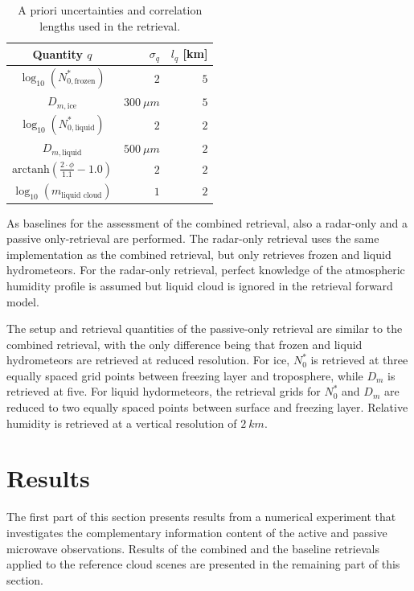 \documentclass[journal abbreviation, manuscript]{copernicus}
\begin{document}
\begin{table}[h!]
\caption{A priori uncertainties and correlation
 lengths used in the retrieval.}
 \centering
\label{tab:a_priori}
    \begin{tabular}{c|r|r}
     Quantity $q$ & $\sigma_q$ & $l_q$ [km]\\
    \hline
    $\log_{10}(N_{0, \text{frozen}}^*)$    & $2$                       & $5$ \\
    $D_{m, \text{ice}}$               & $300\ \unit{\mu m}$          & $5$ \\
    $\log_{10}(N_{0, \text{liquid}}^*)$    & $2                      $ & $2$ \\
    $D_{m, \text{liquid}}$            & $500\ \unit{\mu m}$           & $2$ \\
    $\text{arctanh}(\frac{2 \cdot \phi}{1.1} - 1.0)$ & $2$       & $2$ \\
    $\log_{10}(m_\text{liquid cloud}) $ & $1$                       & $2$ \\
    \end{tabular}
\end{table}

As baselines for the assessment of the combined retrieval, also a radar-only and
a passive only-retrieval are performed. The radar-only retrieval uses the same
implementation as the combined retrieval, but only retrieves frozen and liquid
hydrometeors. For the radar-only retrieval, perfect knowledge of the atmospheric
humidity profile is assumed but liquid cloud is ignored in the retrieval forward
model.

The setup and retrieval quantities of the passive-only retrieval are similar to
the combined retrieval, with the only difference being that frozen and liquid
hydrometeors are retrieved at reduced resolution. For ice, $N_0^*$ is retrieved
at three equally spaced grid points between freezing layer and troposphere, while
$D_m$ is retrieved at five. For liquid hydormeteors, the retrieval grids for
$N_0^*$ and $D_m$ are reduced to two equally spaced points between surface and
freezing layer. Relative humidity is retrieved at a vertical resolution of
$2\ \unit{km}$.

\section{Results}
\label{sec:results}

The first part of this section presents results from a numerical experiment 
that investigates the complementary information content of the active and passive
microwave observations. Results of the combined  and the baseline retrievals applied
to the reference cloud scenes are presented in the remaining part of this section.
\end{document}
